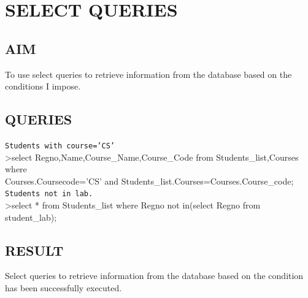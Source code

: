 \documentclass{article}
\begin{document}
\section{SELECT QUERIES}
\hrulefill
\vspace{1cm}
\begin{flushleft}

\subsection{AIM}
To use select queries to retrieve information from the database based on the conditions I impose.
\subsection{QUERIES}
\vspace{0.2in}
\texttt{Students with course='CS'}\\
\vspace{0.1in}\textgreater select Regno,Name,Course\_Name,Course\_Code from Students\_list,Courses where \\ \vspace{0.1in}\hspace{0.1in} Courses.Coursecode='CS' and Students\_list.Courses=Courses.Course\_code;\\
\vspace{0.2in}\texttt{Students not in lab.}\\
\vspace{0.1in}\textgreater select * from Students\_list where Regno not in(select Regno from student\_lab);
\vspace{0.3in}
\subsection{RESULT}
Select queries to retrieve information from the database based on the condition has been successfully executed.
\end{flushleft}
\newpage
{}
\end{document}
